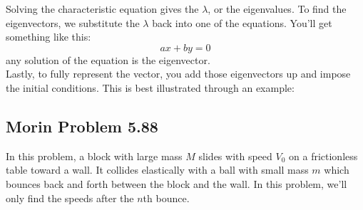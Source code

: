 \documentclass[oneside]{book}
\numberwithin{equation}{chapter} %
\begin{document}
Solving the characteristic equation gives the $\lambda$, or the eigenvalues. To find the eigenvectors, we substitute the $\lambda$ back into one of the equations. You'll get something like this:
$$ax+by=0$$
any solution of the equation is the eigenvector.\\

Lastly, to fully represent the vector, you add those eigenvectors up and impose the initial conditions. This is best illustrated through an example:
\subsection{Morin Problem 5.88}
In this problem, a block with large mass $M$ slides with speed $V_0$ on a frictionless table toward a wall. It collides elastically with a ball with small mass $m$ which bounces back and forth between the block and the wall. In this problem, we'll only find the speeds after the $n$th bounce. \\
\end{document}
